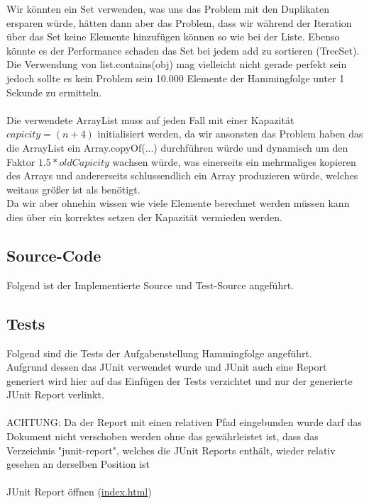 \documentclass[11pt, a4paper, twoside]{article}   	%
\newcommand{\srcDir}{../src/main/java}
\newcommand{\srcTestDir}{../src/test/java}
\newcommand{\mainPackage}{\srcDir/at/fhooe/swe4/lab3}
\newcommand{\mainTestPackage}{\srcTestDir/at/fhooe/swe4/lab3/test}
\newcommand{\junitReportDir}{junit-report}
\newcommand{\sourceSection}{Source-Code}
\newcommand{\testSection}{Tests}
\begin{document}
Wir könnten ein Set verwenden, was uns das Problem mit den Duplikaten ersparen würde, hätten dann aber das Problem, dass wir während der Iteration über das Set keine Elemente hinzufügen können so wie bei der Liste. Ebenso könnte es der Performance schaden das Set bei jedem add zu sortieren (TreeSet).\\
Die Verwendung von list.contains(obj) mag vielleicht nicht gerade perfekt sein jedoch sollte es kein Problem sein 10.000 Elemente der Hammingfolge unter 1 Sekunde zu ermitteln.\\\\
Die verwendete ArrayList muss auf jeden Fall mit einer Kapazität $capicity = (n+ 4)$ initialisiert werden, da wir ansonsten das Problem haben das die ArrayList ein Array.copyOf(...) durchführen würde und dynamisch um den Faktor $1.5 \ast oldCapicity$ wachsen würde, was einerseits ein mehrmaliges kopieren des Arrays und andererseits schlussendlich ein Array produzieren würde, welches weitaus größer ist als benötigt.\\
Da wir aber ohnehin wissen wie viele Elemente berechnet werden müssen kann dies über ein korrektes setzen der Kapazität vermieden werden.
\newpage
\subsection{\sourceSection}
Folgend ist der Implementierte Source und Test-Source angeführt.


\subsection{\testSection}
Folgend sind die Tests der Aufgabenstellung Hammingfolge angeführt.\\
Aufgrund dessen das JUnit verwendet wurde und JUnit auch eine Report generiert wird hier auf das Einfügen der Tests verzichtet und nur der generierte JUnit Report verlinkt.\\\\
{\color{myred} ACHTUNG: Da der Report mit einen relativen Pfad eingebunden wurde darf das Dokument nicht verschoben werden ohne das gewährleistet ist, dass das Verzeichnis "\junitReportDir", welches die JUnit Reports enthält, wieder relativ gesehen an derselben Position ist}\\\\
JUnit Report öffnen (\href{\junitReportDir/index.html}{index.html})
\end{document}

